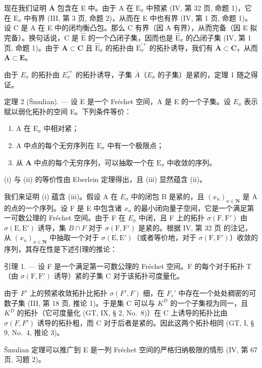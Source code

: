 现在我们证明 \(\overline{\mathbf{A}}\) 包含在 E 中。由于 A 在 \(\mathrm{E}_{\sigma}\) 中预紧 (IV, 第 32 页, 命题 1)，它在 \(\mathrm{E}_{\sigma}\) 中有界 (III, 第 3 页, 命题 2)，从而在 E 中也有界 (IV, 第 1 页, 命题 1)。设 C 是 A 在 E 中的闭均衡凸包。那么 C 有界（因 A 有界），从而完备（因 E 拟完备）。换句话说，C 是 \(\hat{\mathrm{E}}\) 的一个凸闭子集，因而也是 \(\hat{\mathrm{E}}_{\sigma}\) 的凸闭子集 (IV, 第 1 页, 命题 1)。由于 \(\mathbf{A} \subset \mathbf{C}\) 且 \(\hat{\mathrm{E}}_{\sigma}\) 的拓扑由 \(\mathrm{E}_{\sigma}^{\prime *}\) 的拓扑诱导，我们有 \(\overline{\mathbf{A}} \subset \mathbf{C}\)，从而 \(\overline{\mathbf{A}} \subset \mathbf{E}\)。

由于 \(E_{\sigma}\) 的拓扑由 \(E_{\sigma}^{\prime*}\) 的拓扑诱导，子集 \(\overline{A}\)（\(E_{\sigma}\) 的子集）是紧的，定理 1 随之得证。

定理 2 (Šmulian). --- 设 E 是一个 Fréchet 空间，A 是 E 的一个子集。设 \(E_{\sigma}\) 表示赋以弱化拓扑的空间 E。下列条件等价：

\begin{enumerate}
\def\labelenumi{(\roman{enumi})}
\item
  A 在 \(\mathrm{E}_{\sigma}\) 中相对紧；
\item
  A 中点的每个无穷序列在 \(\mathrm{E}_{\sigma}\) 中有一个极限点；
\item
  从 \(\mathbf{A}\) 中点的每个无穷序列，可以抽取一个在 \(\mathrm{E}_{\sigma}\) 中收敛的序列。
\end{enumerate}

(i) 与 (ii) 的等价性由 Eberlein 定理得出，且 (iii) 显然蕴含 (ii)。

我们来证明 (i) 蕴含 (iii)。假设 A 在 \(E_{\sigma}\) 中的闭包 B 是紧的，且 \((x_{n})_{n\in\mathbf{N}}\) 是 A 的点的一个序列。设 F 是 E 中包含诸 \(x_{n}\) 的最小闭向量子空间，它是一个满足第一可数公理的 Fréchet 空间。由于 F 在 \(E_{\sigma}\) 中闭，且 F 上的拓扑 \(\sigma(\mathrm{F},\mathrm{F}')\) 由 \(\sigma(\mathrm{E},\mathrm{E}')\) 诱导，集 \(B\cap F\) 对于 \(\sigma(\mathrm{F},\mathrm{F}')\) 是紧的。根据 IV, 第 32 页 的注记，从 \((x_{n})_{n\in\mathbf{N}}\) 中抽取一个对于 \(\sigma(\mathrm{E},\mathrm{E}')\)（或者等价地，对于 \(\sigma(\mathrm{F},\mathrm{F}')\)）收敛的序列，其存在性是下述引理的推论：

引理 1. --- 设 F 是一个满足第一可数公理的 Fréchet 空间。F 的每个对于拓扑 T（由 \(\sigma(\mathrm{F},\mathrm{F}')\) 诱导）紧的子集 C 对于该拓扑可度量化。

由于 \(F'\) 上的预紧收敛拓扑比拓扑 \(\sigma(F', F)\) 细，在 \(F_{s}'\) 中存在一个处处稠密的可数子集 (III, 第 18 页, 推论 1)。于是集 C 可以与 \(K^{D}\) 的一个子集视为同一，且 \(K^{D}\) 的拓扑（它可度量化 (GT, IX, § 2, No.~8)）在 C 上诱导的拓扑比由 \(\sigma(F, F')\) 诱导的拓扑粗，而 C 对于后者是紧的。因此这两个拓扑相同 (GT, I, § 9, No.~4, 推论 3)。

Šmulian 定理可以推广到 E 是一列 Fréchet 空间的严格归纳极限的情形 (IV, 第 67 页, 习题 2)。

